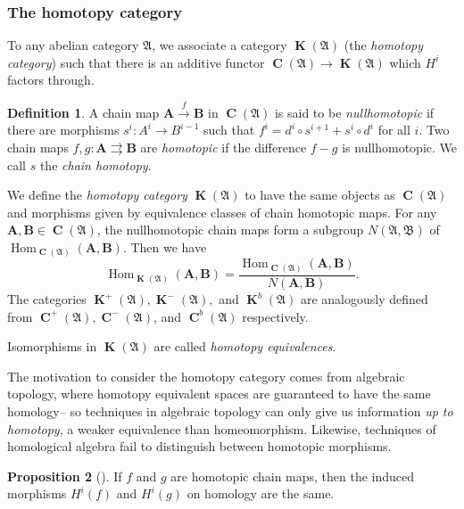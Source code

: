 \documentclass[a4paper]{article}
\theoremstyle{definition}
\newtheorem{defn}{Definition}[section]
\newtheorem{prop}[defn]{Proposition}
\theoremstyle{remark}
\DeclareMathOperator{\Hom}{\text{Hom}}
\DeclareMathOperator{\Ch}{\mathbf{C}}
\DeclareMathOperator{\kom}{{\mathbf{K}}}
\begin{document}
\subsubsection{The homotopy category}
To any abelian category \(\mathfrak{A}\), we
associate a category \(\kom(\mathfrak{A})\) (the \textit{homotopy category})
such that there is an additive functor \(\Ch(\mathfrak{A})\rightarrow
\kom(\mathfrak{A})\) which \(H^i\) factors through.

\begin{defn}
    A chain map \(\mathbf{A}\xrightarrow{f}\mathbf{B}\) in \(\Ch(\mathfrak{A})\)
    is said to be \textit{nullhomotopic} if there are morphisms \(s^i:
    A^i\rightarrow B^{i-1}\) such that \(f^i=d^i\circ s^{i+1} + s^i\circ d^i\)
    for all \(i\). Two chain maps \(f,g: \mathbf{A}\rightrightarrows
    \mathbf{B}\) are \textit{homotopic} if the difference \(f-g\) is
    nullhomotopic. We call \(s\) the \textit{chain homotopy}.
\end{defn}

We define the \textit{homotopy category} \(\kom(\mathfrak{A})\) to have the same
objects as \(\Ch(\mathfrak{A})\) and morphisms given by equivalence classes of
chain homotopic maps. For any \(\mathbf{A},\mathbf{B}\in \Ch(\mathfrak{A})\),
the nullhomotopic chain maps form a subgroup \(N(\mathfrak{A},\mathfrak{B})\) of
\(\Hom_{\Ch(\mathfrak{A})}(\mathbf{A},\mathbf{B})\). Then we have
\[\Hom_{\kom(\mathfrak{A})}(\mathbf{A},\mathbf{B})=
\frac{\Hom_{\Ch(\mathfrak{A})}(\mathbf{A},\mathbf{B})}{N(\mathbf{A},\mathbf{B})}.\]
The categories \(\kom^+(\mathfrak{A}), \kom^-(\mathfrak{A}),\) and
\(\kom^b(\mathfrak{A})\) are analogously defined from \(\Ch^+(\mathfrak{A}),
\Ch^-(\mathfrak{A})\), and \(\Ch^b(\mathfrak{A})\) respectively.

Isomorphisms in \(\kom(\mathfrak{A})\) are called \textit{homotopy
equivalences}.

The motivation to consider the homotopy category comes from algebraic topology,
where homotopy equivalent spaces are guaranteed to have the same homology-- so
techniques in algebraic topology can only give us information \textit{up to
homotopy}, a weaker equivalence than homeomorphism. Likewise, techniques of
homological algebra fail to distinguish between homotopic morphisms.

\begin{prop}[]
    If \(f\) and \(g\) are homotopic chain maps, then the induced morphisms
    \(H^i(f)\) and \(H^i(g)\) on homology are the same. 
\end{prop}
\end{document}
